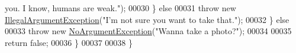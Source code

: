 \begin{DoxyCode}
{       you. I know, humans are weak."});
00030             \} \textcolor{keywordflow}{else}
00031                 \textcolor{keywordflow}{throw} \textcolor{keyword}{new} \hyperlink{classIllegalArgumentException}{IllegalArgumentException}(\textcolor{stringliteral}{"I'm not sure you want to take
       that."});
00032         \} \textcolor{keywordflow}{else}
00033             \textcolor{keywordflow}{throw} \textcolor{keyword}{new} \hyperlink{classNoArgumentException}{NoArgumentException}(\textcolor{stringliteral}{"Wanna take a photo?"});
00034 
00035         \textcolor{keywordflow}{return} \textcolor{keyword}{false};
00036     \}
00037 
00038 \}
\end{DoxyCode}
